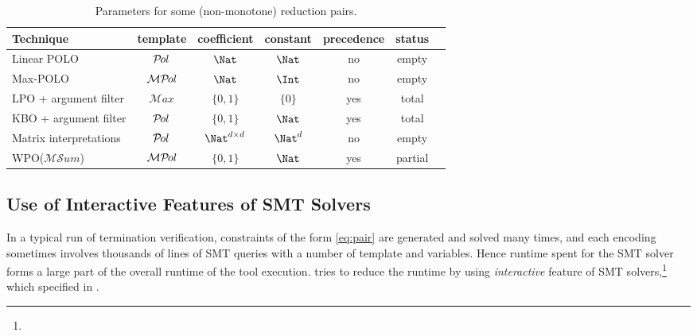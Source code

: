\documentclass{llncs}
\newif\iffullversion
\def\Amax{{\mathcal{M}ax}}
\def\Ams{{\mathcal{MS}um}}
\def\Apol{{\mathcal{P}\kern-.1emol}}
\def\Amp{{\mathcal{M}\Apol}}
\begin{document}
\begin{table}[tb]
\caption{\label{tab:parameters 2}Parameters for some (non-monotone) reduction pairs.}\iffullversion
\else
	\vspace{-1ex}\fi
\centering
\begin{tabular}{l@{\ }|cccccl}
	Technique	&template&coefficient&constant&precedence&status
\\	\hline
	Linear POLO
				&$\Apol$&$\Nat$		&$\Nat$	&no	&empty
\\	Max-POLO
				&$\Amp$	&$\Nat$		&$\Int$	&no	&empty
\\	LPO + argument filter
				&$\Amax$&$\{0,1\}$	&$\{0\}$&yes&total
\\	KBO + argument filter
				&$\Apol$&$\{0,1\}$	&$\Nat$	&yes&total
\\	Matrix interpretations
				&$\Apol$&$\Nat^{d\times d}$&$\Nat^d$&no	&empty
\\	WPO($\Ams$)
				&$\Amp$	&$\{0,1\}$	&$\Nat$	&yes&partial
\end{tabular}
\iffullversion
\else
	\vspace{-2ex}\fi
\end{table}
\subsection{Use of Interactive Features of SMT Solvers}
\label{sec:interactive}

In a typical run of termination verification,
constraints of the form \eqref{eq:pair} are generated and solved many times,
and each encoding sometimes involves thousands of lines of SMT queries
with a number of template and  variables.
Hence runtime spent for the SMT solver forms a large part of
the overall runtime of the tool execution.
\NaTT tries to reduce the runtime by using
\emph{interactive} feature of SMT solvers,\footnote{}
which  specified in .
\end{document}
